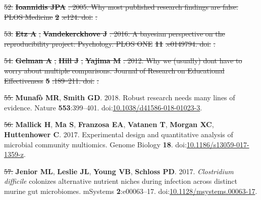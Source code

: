 \documentclass[]{article}
\providecommand{\DIFaddtex}[1]{{\protect\color{blue}\uwave{#1}}} %
\providecommand{\DIFdeltex}[1]{{\protect\color{red}\sout{#1}}}                      %
\providecommand{\DIFaddbegin}{} %
\providecommand{\DIFaddend}{} %
\providecommand{\DIFdelbegin}{} %
\providecommand{\DIFdelend}{} %
\providecommand{\DIFadd}[1]{\texorpdfstring{\DIFaddtex{#1}}{#1}} %
\providecommand{\DIFdel}[1]{\texorpdfstring{\DIFdeltex{#1}}{}} %
\begin{document}
\DIFdel{52. }\textbf{\DIFdel{Ioannidis JPA}}%
\DIFdel{. 2005. Why most published research findings
are false. PLOS Medicine }\textbf{\DIFdel{2}}%
\DIFdel{:e124.
doi:}%
\DIFdel{.
}%

\DIFdel{53. }\textbf{\DIFdel{Etz A}}%
\DIFdel{, }\textbf{\DIFdel{Vandekerckhove J}}%
\DIFdel{. 2016. A bayesian
perspective on the reproducibility project: Psychology. PLOS ONE
}\textbf{\DIFdel{11}}%
\DIFdel{:e0149794.
doi:}%
\DIFdel{.
}%

\DIFdel{54. }\textbf{\DIFdel{Gelman A}}%
\DIFdel{, }\textbf{\DIFdel{Hill J}}%
\DIFdel{, }\textbf{\DIFdel{Yajima M}}%
\DIFdel{. 2012. Why we
(usually) dont have to worry about multiple comparisons. Journal of
Research on Educational Effectiveness }\textbf{\DIFdel{5}}%
\DIFdel{:189--211.
doi:}%
\DIFdel{.
}%

\DIFdelend \hypertarget{ref-Munaf2018}{}
\DIFdelbegin \DIFdel{55. }\DIFdelend \DIFaddbegin \DIFadd{57. }\DIFaddend \textbf{Munafò MR}, \textbf{Smith GD}. 2018. Robust research needs
many lines of evidence. Nature \textbf{553}:399--401.
doi:\href{https://doi.org/10.1038/d41586-018-01023-3}{10.1038/d41586-018-01023-3}.

\hypertarget{ref-Mallick2017}{}
\DIFdelbegin \DIFdel{56. }\DIFdelend \DIFaddbegin \DIFadd{58. }\DIFaddend \textbf{Mallick H}, \textbf{Ma S}, \textbf{Franzosa EA},
\textbf{Vatanen T}, \textbf{Morgan XC}, \textbf{Huttenhower C}. 2017.
Experimental design and quantitative analysis of microbial community
multiomics. Genome Biology \textbf{18}.
doi:\href{https://doi.org/10.1186/s13059-017-1359-z}{10.1186/s13059-017-1359-z}.

\hypertarget{ref-Jenior2017}{}
\DIFdelbegin \DIFdel{57. }\DIFdelend \DIFaddbegin \DIFadd{59. }\DIFaddend \textbf{Jenior ML}, \textbf{Leslie JL}, \textbf{Young VB},
\textbf{Schloss PD}. 2017. \emph{Clostridium difficile} colonizes
alternative nutrient niches during infection across distinct murine gut
microbiomes. mSystems \textbf{2}:e00063--17.
doi:\href{https://doi.org/10.1128/msystems.00063-17}{10.1128/msystems.00063-17}.
\end{document}
